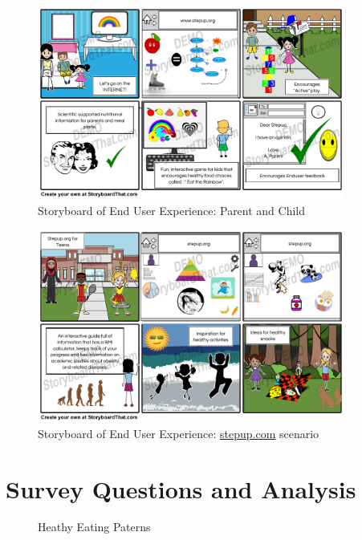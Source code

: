 \documentclass[letterpaper,12pt]{article}
\begin{document}
\begin{figure}[ht!]
  \centering
  \includegraphics[width=0.9\textwidth]{assets/jpg/parent_and_children_experience}
  \caption{Storyboard of End User Experience: Parent and Child}
  \label{fig:parent-and-children-experience}
\end{figure}
\FloatBarrier
\begin{figure}[ht!]
  \centering
  \includegraphics[width=0.9\textwidth]{assets/jpg/stepup_com_scenario_2}
  \caption{Storyboard of End User Experience: \url{stepup.com} scenario}
  \label{fig:stepup-com-scenario-2}
\end{figure}
\FloatBarrier

\section{Survey Questions and Analysis}

\begin{figure}[ht!]
  \centering
  \begin{bchart}[step=15,max=100,width=12cm]
  \end{bchart}
  \caption{Heathy Eating Paterns}
  \label{tab:heating-patterns}
\end{figure}
\end{document}
